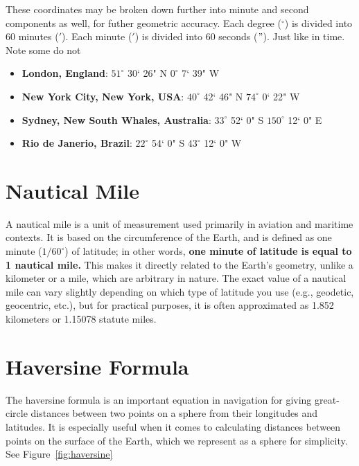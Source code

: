These coordinates may be broken down further into minute and second components as well, for futher geometric accuracy.
Each degree ($^\circ$) is divided into 60 minutes ($'$). Each minute ($'$) is divided into 60 seconds ($"$). Just like in time. Note some do not

\begin{itemize}
  \item \textbf{London, England}: $51^\circ$ 30` 26" N $0^\circ$ 7` 39" W
  \item \textbf{New York City, New York, USA}: $40^\circ$ 42` 46" N $74^\circ$ 0` 22" W
  \item \textbf{Sydney, New South Whales, Australia}: $33^\circ$ 52` 0" S $150^\circ$ 12` 0" E
  \item \textbf{Rio de Janerio, Brazil}: $22^\circ$ 54` 0" S $43^\circ$ 12` 0" W
\end{itemize}

\section{Nautical Mile}
A nautical mile is a unit of measurement used primarily in aviation
and maritime contexts. It is based on the circumference of the Earth,
and is defined as one minute ($1/60^{\circ}$) of latitude; in other words, \textbf{one minute of latitude is equal to 1 nautical mile.} 
This makes it directly related to the Earth's geometry, unlike a kilometer or a
mile, which are arbitrary in nature. The exact value of a nautical
mile can vary slightly depending on which type of latitude you use
(e.g., geodetic, geocentric, etc.), but for practical purposes, it is
often approximated as 1.852 kilometers or 1.15078 statute miles.

\section{Haversine Formula}

The haversine formula is an important equation in navigation for
giving great-circle distances between two points on a sphere from
their longitudes and latitudes. It is especially useful when it comes
to calculating distances between points on the surface of the Earth,
which we represent as a sphere for simplicity. See Figure~\ref{fig:haversine} 

